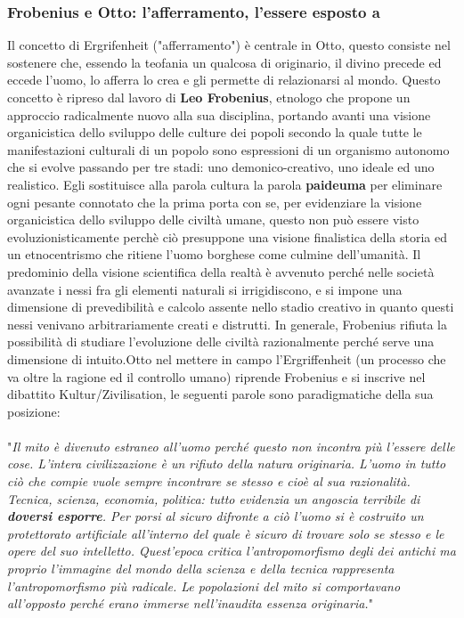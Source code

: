 \documentclass[10pt,a4paper]{article}
\begin{document}
\subsubsection{Frobenius e Otto: l'afferramento, l'essere esposto a}
Il concetto di Ergrifenheit ("afferramento") è centrale in Otto, questo consiste nel sostenere che, essendo la teofania un qualcosa di originario, il divino precede ed eccede l'uomo, lo afferra lo crea e gli permette di relazionarsi al mondo. Questo concetto è ripreso dal lavoro di \textbf{Leo Frobenius}, etnologo che propone un approccio radicalmente nuovo alla sua disciplina, portando avanti una visione organicistica dello sviluppo delle culture dei popoli secondo la quale tutte le manifestazioni culturali di un popolo sono espressioni di un organismo autonomo che si evolve passando per tre stadi: uno demonico-creativo, uno ideale ed uno realistico. Egli sostituisce alla parola cultura la parola \textbf{paideuma} per eliminare ogni pesante connotato che la prima porta con se, per evidenziare la visione organicistica dello sviluppo delle civiltà umane, questo non può essere visto evoluzionisticamente perchè ciò presuppone una visione finalistica della storia ed un etnocentrismo che ritiene l'uomo borghese come culmine dell'umanità. Il predominio della visione scientifica della realtà è avvenuto perché nelle società avanzate i nessi fra gli elementi naturali si irrigidiscono, e si impone una dimensione di prevedibilità e calcolo assente nello stadio creativo in quanto questi nessi venivano arbitrariamente creati e distrutti. In generale, Frobenius rifiuta la possibilità di studiare l'evoluzione delle civiltà razionalmente perché serve una dimensione di intuito.Otto nel mettere in campo l'Ergriffenheit (un processo che va oltre la ragione ed il controllo umano) riprende Frobenius e si inscrive nel dibattito Kultur/Zivilisation, le seguenti parole sono paradigmatiche della sua posizione:\\\\
 "\textit{Il mito è divenuto estraneo all'uomo perché questo non incontra più l'essere delle cose. L'intera civilizzazione è un rifiuto della natura originaria. L'uomo in tutto ciò che compie vuole sempre incontrare se stesso e cioè al sua razionalità. Tecnica, scienza, economia, politica: tutto evidenzia un angoscia terribile di \textbf{doversi esporre}. Per porsi al sicuro difronte a ciò l'uomo si è costruito un protettorato artificiale all'interno del quale è sicuro di trovare solo se stesso e le opere del suo intelletto. Quest'epoca critica l'antropomorfismo degli dei antichi ma proprio l'immagine del mondo della scienza e della tecnica rappresenta l'antropomorfismo più radicale. Le popolazioni del mito si comportavano all'opposto perché erano immerse nell'inaudita essenza originaria.}"\\\\
\end{document}
